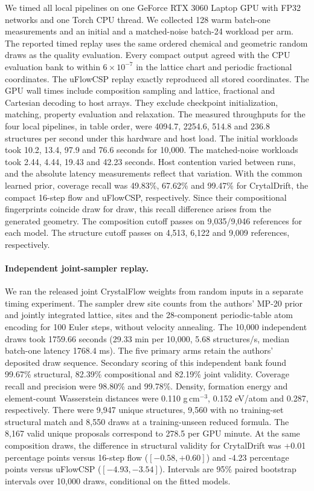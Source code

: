 We timed all local pipelines on one GeForce RTX 3060 Laptop GPU with FP32 networks and one Torch CPU thread. We collected 128 warm batch-one measurements and an initial and a matched-noise batch-24 workload per arm. The reported timed replay uses the same ordered chemical and geometric random draws as the quality evaluation. Every compact output agreed with the CPU evaluation bank to within $6\times 10^{-7}$ in the lattice chart and periodic fractional coordinates. The uFlowCSP replay exactly reproduced all stored coordinates. The GPU wall times include composition sampling and lattice, fractional and Cartesian decoding to host arrays. They exclude checkpoint initialization, matching, property evaluation and relaxation. The measured throughputs for the four local pipelines, in table order, were 
4094.7, 2254.6, 514.8 and 236.8 structures per second under this hardware and host load.
The initial workloads took 10.2, 13.4, 97.9 and 76.6 seconds for 10,000. The matched-noise workloads took 2.44, 4.44, 19.43 and 42.23 seconds. Host contention varied between runs, and the absolute latency measurements reflect that variation.
With the common learned prior, coverage recall was 49.83\%, 67.62\% and 99.47\% for CrytalDrift, the compact 16-step flow and uFlowCSP, respectively. Since their compositional fingerprints coincide draw for draw, this recall difference arises from the generated geometry.
The composition cutoff passes on 9,035/9,046 references for each model. The structure cutoff passes on 4,513, 6,122 and 9,009 references, respectively.
\paragraph{Independent joint-sampler replay.} We ran the released joint CrystalFlow weights from random inputs in a separate timing experiment. The sampler drew site counts from the authors' MP-20 prior and jointly integrated lattice, sites and the 28-component periodic-table atom encoding for 100 Euler steps, without velocity annealing. The 10,000 independent draws took 1759.66 seconds (29.33 min per 10,000, 5.68 structures/s, median batch-one latency 1768.4 ms). The five primary arms retain the authors' deposited draw sequence.
Secondary scoring of this independent bank found 99.67\% structural, 82.39\% compositional and 82.19\% joint validity. Coverage recall and precision were 98.80\% and 99.78\%. Density, formation energy and element-count Wasserstein distances were 0.110 g\,cm$^{-3}$, 0.152 eV/atom and 0.287, respectively. There were 9,947 unique structures, 9,560 with no training-set structural match and 8,550 draws at a training-unseen reduced formula. The 8,167 valid unique proposals correspond to 278.5 per GPU minute.
At the same composition draws, the difference in structural validity for CrytalDrift was +0.01 percentage points versus 16-step flow ($[-0.58,+0.60]$) and -4.23 percentage points versus uFlowCSP ($[-4.93,-3.54]$). Intervals are 95\% paired bootstrap intervals over 10,000 draws, conditional on the fitted models.
